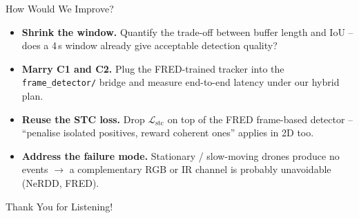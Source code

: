 \documentclass[aspectratio=169,11pt]{beamer}
\begin{document}
\begin{frame}{How Would We Improve?}
  \vspace{0.5em}
  \begin{itemize}
    \setlength\itemsep{0.5em}
    \item \textbf{Shrink the window.} Quantify the trade-off between buffer length and IoU --
          does a 4\,s window already give acceptable detection quality?
    \item \textbf{Marry C1 and C2.} Plug the FRED-trained tracker into the
          \texttt{frame\_detector/} bridge and measure end-to-end latency under our hybrid plan.
    \item \textbf{Reuse the STC loss.} Drop $\mathcal{L}_{\text{stc}}$ on top of the FRED frame-based detector
          -- ``penalise isolated positives, reward coherent ones'' applies in 2D too.
    \item \textbf{Address the failure mode.} Stationary / slow-moving drones produce no events
          $\to$ a complementary RGB or IR channel is probably unavoidable (NeRDD, FRED).
  \end{itemize}
\end{frame}

\begin{frame}[plain]
  \vspace{3cm}
  \hspace{1.2cm}%
  {\selectfont\fontsize{56}{68}\selectfont Thank You for Listening!}
\end{frame}
\end{document}
